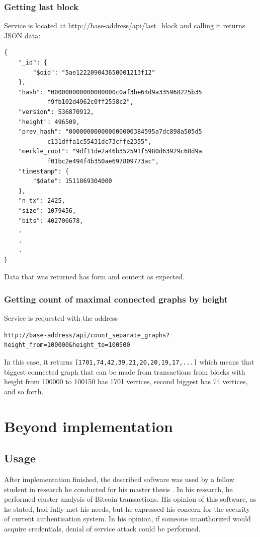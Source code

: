 \documentclass[12pt, en, eng, oneside, final]{mgr}
\begin{document}
\subsection{Getting last block}
Service is located at http://base-address/api/last\_block and calling it returns JSON data:
\begin{lstlisting}[caption=Response on last block API call]
{
    "_id": {
        "$oid": "5ae122209043650001213f12"
    },
    "hash": "000000000000000000c0af3be64d9a335968225b35
    		f9fb102d4962c0ff2558c2",
    "version": 536870912,
    "height": 496509,
    "prev_hash": "000000000000000000384595a7dc898a505d5
    		c131dffa1c55431dc73cffe2355",
    "merkle_root": "9df11de2a46b352591f5980d63929c68d9a
    		f01bc2e494f4b350ae697809773ac",
    "timestamp": {
        "$date": 1511869304000
    },
    "n_tx": 2425,
    "size": 1079456,
    "bits": 402706678,
    .
    .
    .
}
\end{lstlisting}

Data that was returned has form and content as expected. 

\subsection{Getting count of maximal connected graphs by height}
Service is requested with the address
\\ 
\begin{verbatim}
http://base-address/api/count_separate_graphs?
height_from=100000&height_to=100500
\end{verbatim}

In this case, it returns \texttt{[1701,74,42,39,21,20,20,19,17,...]} which means that biggest connected graph that can be made from transactions from blocks with height from 100000 to 100150 has 1701 vertices, second biggest has 74 vertices, and so forth.


\chapter{Beyond implementation}

\section{Usage}
After implementation finished, the described software was used by a fellow student in research he conducted for his master thesis \cite{twardak}. In his research, he performed cluster analysis of Bitcoin transactions. His opinion of this software, as he stated, had fully met his needs, but he expressed his concern for the security of current authentication system. In his opinion, if someone unauthorized would acquire credentials, denial of service attack could be performed.
\end{document}
